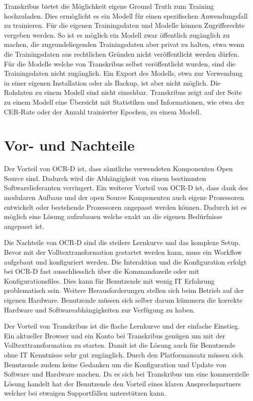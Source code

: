 \documentclass[a4paper,oneside, 12pt]{report}
\begin{document}
Transkribus bietet die Möglichkeit eigene Ground Truth zum Training hochzuladen. Dies ermöglicht es ein Modell für einen spezifischen Anwendungsfall zu trainieren. Für die eigenen Trainingsdaten und Modelle können Zugriffsrechte vergeben werden. So ist es möglich ein Modell zwar öffentlich zugänglich zu machen, die zugrundeliegenden Trainingsdaten aber privat zu halten, etwa wenn die Trainingsdaten aus rechtlichen Gründen nicht veröffentlicht werden dürfen. Für die Modelle welche von Transkribus selbst veröffentlicht wurden, sind die Trainingsdaten nicht zugänglich. Ein Export des Modells, etwa zur Verwendung in einer eigenen Installation oder als Backup, ist aber nicht möglich. Die Rohdaten zu einem Modell sind nicht einsehbar. Transkribus zeigt auf der Seite zu einem Modell eine Übersicht mit Statistiken und Informationen, wie etwa der CER-Rate oder der Anzahl trainierter Epochen, zu einem Modell. \cite{transkribusmodels}


\section{Vor- und Nachteile}
Der Vorteil von OCR-D ist, dass sämtliche verwendeten Komponenten Open Source sind. Dadurch wird die Abhängigkeit von einem bestimmten Softwarelieferanten verringert. Ein weiterer Vorteil von OCR-D ist, dass dank des modularen Aufbaus und der open Source Komponenten auch eigene Prozessoren entwickelt oder bestehende Prozessoren angepasst werden können. Dadurch ist es möglich eine Lösung aufzubauen welche exakt an die eigenen Bedürfnisse angepasst ist.

Die Nachteile von OCR-D sind die steilere Lernkurve und das komplexe Setup. Bevor mit der Volltextransformation gestartet werden kann, muss ein Workflow aufgebaut und konfiguriert werden. Die Interaktion und die Konfiguration erfolgt bei OCR-D fast ausschliesslich über die Kommandozeile oder mit Konfigurationsfiles. Dies kann für Benutzende mit wenig IT Erfahrung problematisch sein. Weitere Herausforderungen stellen sich beim Betrieb auf der eigenen Hardware. Benutzende müssen sich selber darum kümmern die korrekte Hardware und Softwareabhängigkeiten zur Verfügung zu haben.

Der Vorteil von Transkribus ist die flache Lernkurve und der einfache Einstieg. Ein aktueller Browser und ein Konto bei Transkribus genügen um mit der Volltexttransformation zu starten. Damit ist die Lösung auch für Benutzende ohne IT Kenntnisse sehr gut zugänglich. Durch den Platformansatz müssen sich Benutzende zudem keine Gedanken um die Konfiguration und Update von Software und Hardware machen. Da es sich bei Transkribus um eine kommerzielle Lösung handelt hat der Benutzende den Vorteil eines klaren Ansprechspartners welcher bei etwaigen Supportfällen unterstützen kann.
\end{document}
